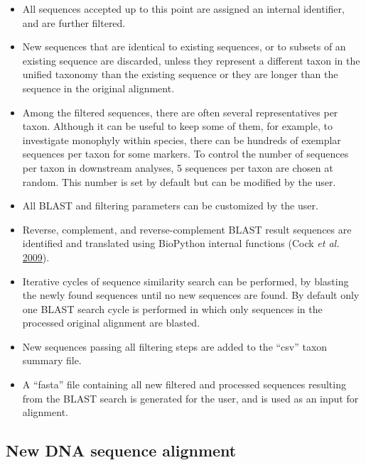 \documentclass[]{article}
\begin{document}
\begin{itemize}
\item
  All sequences accepted up to this point are assigned an internal identifier, and are further filtered.
\item
  New sequences that are identical to existing sequences, or to subsets of an existing sequence are discarded, unless they represent a different taxon in the unified taxonomy than the existing sequence or they are longer than the sequence in the original alignment.
\item
  Among the filtered sequences, there are often several representatives per taxon.
  Although it can be useful to keep some of them, for example, to investigate monophyly
  within species, there can be hundreds of exemplar sequences per taxon for some markers.
  To control the number of sequences per taxon in downstream analyses,
  5 sequences per taxon are chosen at random. This number is set by default but can be modified by the user.
\item
  All BLAST and filtering parameters can be customized by the user.
\item
  Reverse, complement, and reverse-complement BLAST result sequences are identified and translated using BioPython internal functions (Cock \emph{et al.} \protect\hyperlink{ref-cock2009biopython}{2009}).
\item
  Iterative cycles of sequence similarity search can be performed, by blasting the newly found sequences until no new sequences are found. By default only one BLAST search cycle is performed in which only sequences in the processed original alignment are blasted.
\item
  New sequences passing all filtering steps are added to the ``csv'' taxon summary file.
\item
  A ``fasta'' file containing all new filtered and processed sequences resulting from the BLAST search is generated for the user, and is used as an input for alignment.
\end{itemize}

\hypertarget{new-dna-sequence-alignment}{%
\subsection{New DNA sequence alignment}\label{new-dna-sequence-alignment}}
\end{document}
